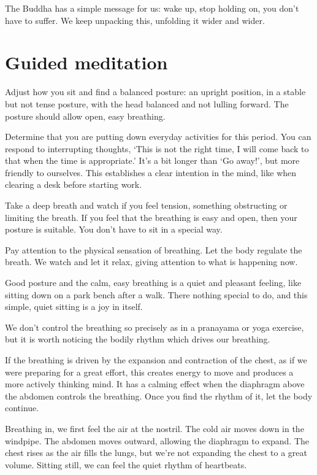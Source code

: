 The Buddha has a simple message for us: wake up, stop holding on, you
don't have to suffer. We keep unpacking this, unfolding it wider and
wider.

\section{Guided meditation}


Adjust how you sit and find a balanced posture: an upright position, in
a stable but not tense posture, with the head balanced and not lulling
forward. The posture should allow open, easy breathing.

\enlargethispage*{\baselineskip}

Determine that you are putting down everyday activities for this period.
You can respond to interrupting thoughts, `This is not the right time, I
will come back to that when the time is appropriate.' It's a bit longer
than `Go away!', but more friendly to ourselves. This establishes a
clear intention in the mind, like when clearing a desk before starting
work.

Take a deep breath and watch if you feel tension, something obstructing
or limiting the breath. If you feel that the breathing is easy and open,
then your posture is suitable. You don't have to sit in a special way.

Pay attention to the physical sensation of breathing. Let the body
regulate the breath. We watch and let it relax, giving attention to what
is happening now.

Good posture and the calm, easy breathing is a quiet and pleasant
feeling, like sitting down on a park bench after a walk. There nothing
special to do, and this simple, quiet sitting is a joy in itself.

We don't control the breathing so precisely as in a pranayama or yoga
exercise, but it is worth noticing the bodily rhythm which drives our
breathing.

If the breathing is driven by the expansion and contraction of the
chest, as if we were preparing for a great effort, this creates energy
to move and produces a more actively thinking mind. It has a calming
effect when the diaphragm above the abdomen controls the breathing. Once
you find the rhythm of it, let the body continue.

Breathing in, we first feel the air at the nostril. The cold air moves
down in the windpipe. The abdomen moves outward, allowing the diaphragm
to expand. The chest rises as the air fills the lungs, but we're not
expanding the chest to a great volume. Sitting still, we can feel the
quiet rhythm of heartbeats.


